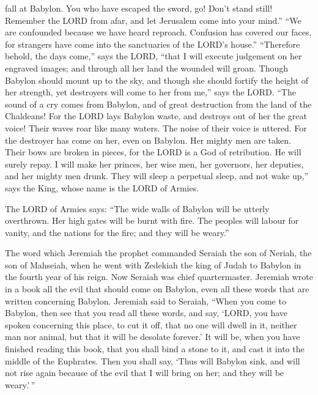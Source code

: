 fall at Babylon.  You who have escaped the sword, go!
Don't stand still! Remember the LORD from afar, and let Jerusalem come
into your mind.''  ``We are confounded because we have
heard reproach. Confusion has covered our faces, for strangers have come
into the sanctuaries of the LORD's house.''  ``Therefore
behold, the days come,'' says the LORD, ``that I will execute judgement
on her engraved images; and through all her land the wounded will groan.
 Though Babylon should mount up to the sky, and though
she should fortify the height of her strength, yet destroyers will come
to her from me,'' says the LORD.  ``The sound of a cry
comes from Babylon, and of great destruction from the land of the
Chaldeans!  For the LORD lays Babylon waste, and destroys
out of her the great voice! Their waves roar like many waters. The noise
of their voice is uttered.  For the destroyer has come on
her, even on Babylon. Her mighty men are taken. Their bows are broken in
pieces, for the LORD is a God of retribution. He will surely repay.
 I will make her princes, her wise men, her governors,
her deputies, and her mighty men drunk. They will sleep a perpetual
sleep, and not wake up,'' says the King, whose name is the LORD of
Armies.

 The LORD of Armies says: ``The wide walls of Babylon
will be utterly overthrown. Her high gates will be burnt with fire. The
peoples will labour for vanity, and the nations for the fire; and they
will be weary.''

 The word which Jeremiah the prophet commanded Seraiah
the son of Neriah, the son of Mahseiah, when he went with Zedekiah the
king of Judah to Babylon in the fourth year of his reign. Now Seraiah
was chief quartermaster.  Jeremiah wrote in a book all
the evil that should come on Babylon, even all these words that are
written concerning Babylon.  Jeremiah said to Seraiah,
``When you come to Babylon, then see that you read all these words,
 and say, `LORD, you have spoken concerning this place,
to cut it off, that no one will dwell in it, neither man nor animal, but
that it will be desolate forever.'  It will be, when you
have finished reading this book, that you shall bind a stone to it, and
cast it into the middle of the Euphrates.  Then you shall
say, `Thus will Babylon sink, and will not rise again because of the
evil that I will bring on her; and they will be weary.'\,''

